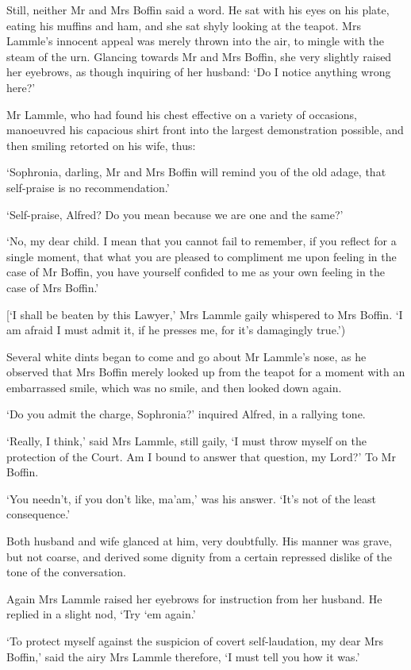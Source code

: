 Still, neither Mr and Mrs Boffin said a word. He sat with his eyes on
his plate, eating his muffins and ham, and she sat shyly looking at the
teapot. Mrs Lammle’s innocent appeal was merely thrown into the air, to
mingle with the steam of the urn. Glancing towards Mr and Mrs Boffin,
she very slightly raised her eyebrows, as though inquiring of her
husband: ‘Do I notice anything wrong here?’

Mr Lammle, who had found his chest effective on a variety of occasions,
manoeuvred his capacious shirt front into the largest demonstration
possible, and then smiling retorted on his wife, thus:

‘Sophronia, darling, Mr and Mrs Boffin will remind you of the old adage,
that self-praise is no recommendation.’

‘Self-praise, Alfred? Do you mean because we are one and the same?’

‘No, my dear child. I mean that you cannot fail to remember, if you
reflect for a single moment, that what you are pleased to compliment me
upon feeling in the case of Mr Boffin, you have yourself confided to me
as your own feeling in the case of Mrs Boffin.’

[‘I shall be beaten by this Lawyer,’ Mrs Lammle gaily whispered to
Mrs Boffin. ‘I am afraid I must admit it, if he presses me, for it’s
damagingly true.’)

Several white dints began to come and go about Mr Lammle’s nose, as he
observed that Mrs Boffin merely looked up from the teapot for a moment
with an embarrassed smile, which was no smile, and then looked down
again.

‘Do you admit the charge, Sophronia?’ inquired Alfred, in a rallying
tone.

‘Really, I think,’ said Mrs Lammle, still gaily, ‘I must throw myself
on the protection of the Court. Am I bound to answer that question, my
Lord?’ To Mr Boffin.

‘You needn’t, if you don’t like, ma’am,’ was his answer. ‘It’s not of
the least consequence.’

Both husband and wife glanced at him, very doubtfully. His manner was
grave, but not coarse, and derived some dignity from a certain repressed
dislike of the tone of the conversation.

Again Mrs Lammle raised her eyebrows for instruction from her husband.
He replied in a slight nod, ‘Try ‘em again.’

‘To protect myself against the suspicion of covert self-laudation, my
dear Mrs Boffin,’ said the airy Mrs Lammle therefore, ‘I must tell you
how it was.’

